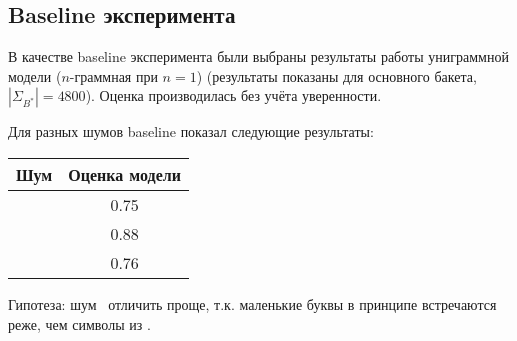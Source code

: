 \subsection{ Baseline эксперимента }

В качестве baseline эксперимента были выбраны результаты работы униграммной модели ($n$-граммная при $n = 1$) (результаты показаны для основного бакета, $|\Sigma_{B^*}| = 4800$). Оценка производилась без учёта уверенности.

Для разных шумов baseline показал следующие результаты:

\begin{tabular}{|c|c|} \hline
	Шум 	& Оценка модели \\ \hline
	\KG	& 0.75  \\
	\BS & 0.88  \\
	\MX & 0.76 \\ \hline
\end{tabular}

\vspace{20pt}

Гипотеза: шум \BS\ отличить проще, т.к. маленькие буквы в принципе встречаются реже, чем символы из \KG. 